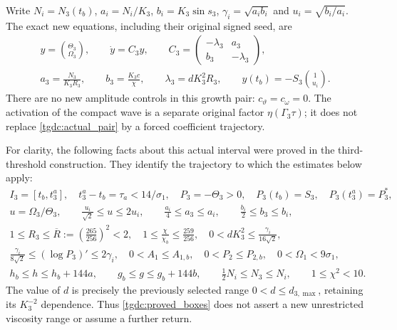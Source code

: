 \documentclass[11pt]{article}
\begin{document}
Write $N_i=N_3(t_b)$, $a_i=N_i/K_3$,
$b_i=K_3\sin s_3$, $\gamma_i=\sqrt{a_i b_i}$ and
$u_i=\sqrt{b_i/a_i}$. The exact new equations, including their
original signed seed, are
\begin{equation}\label{tgdc:actual_pair}
\begin{gathered}
 y=\binom{\Theta_3}{\Omega_3},\qquad
 \dot y=C_3y,\qquad
 C_3=\begin{pmatrix}-\lambda_3&a_3\\b_3&-\lambda_3\end{pmatrix},\\
 a_3=\frac{N_3}{K_3R_3},\qquad
 b_3=\frac{K_3c}{\chi},\qquad
 \lambda_3=dK_3^2R_3,\qquad
 y(t_b)=-S_3\binom1{u_i}.
\end{gathered}
\end{equation}
There are no new amplitude controls in this growth pair:
$c_\vartheta=c_\omega=0$. The activation of the compact wave is a
separate original factor $\eta(\Gamma_3\tau)$; it does not replace
\eqref{tgdc:actual_pair} by a forced coefficient trajectory.

For clarity, the following facts about this actual interval were proved
in the third-threshold construction. They identify the trajectory to
which the estimates below apply:
\begin{equation}\label{tgdc:proved_boxes}
\begin{gathered}
 I_3=[t_b,t_3^a],\quad t_3^a-t_b=\tau_a<14/\sigma_1,\quad
 P_3=-\Theta_3>0,\quad P_3(t_b)=S_3,\quad P_3(t_3^a)=P_3^*,\\
 u=\Omega_3/\Theta_3,\qquad
 \frac{u_i}{\sqrt2}\leq u\leq2u_i,\qquad
 \frac{a_i}4\leq a_3\leq a_i,\qquad
 \frac{b_i}2\leq b_3\leq b_i,\\
 1\leq R_3\leq\overline R:=\left(\frac{265}{256}\right)^2<2,
 \quad 1\leq\frac\chi{\chi_b}\leq\frac{259}{256},\quad
 0<dK_3^2\leq\frac{\gamma_i}{16\sqrt2},\\
 \frac{\gamma_i}{8\sqrt2}\leq (\log P_3)'\leq2\gamma_i,
 \quad 0<A_1\leq A_{1,b},\quad 0<P_2\leq P_{2,b},\quad
 0<\Omega_1<9\sigma_1,\\
 h_b\leq h\leq h_b+144a,\qquad
 g_b\leq g\leq g_b+144b,\qquad
 \tfrac12N_i\leq N_3\leq N_i,\qquad 1\leq\chi^2<10.
\end{gathered}
\end{equation}
The value of $d$ is precisely the previously selected range
$0<d\leq d_{3,\max}$, retaining its $K_3^{-2}$ dependence.
Thus \eqref{tgdc:proved_boxes} does not assert a new unrestricted
viscosity range or assume a further return.
\end{document}

